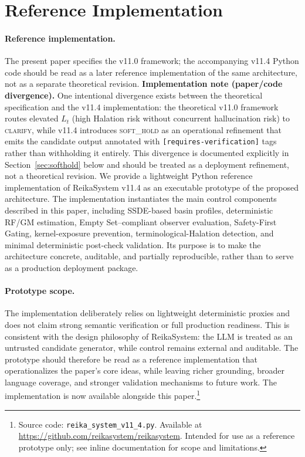 \documentclass[11pt,a4paper]{article}
\begin{document}
\section{Reference Implementation}
\label{sec:impl}

\paragraph{Reference implementation.}
The present paper specifies the v11.0 framework; the accompanying v11.4 Python
code should be read as a later reference implementation of the same architecture,
not as a separate theoretical revision.
\textbf{Implementation note (paper/code divergence).}
One intentional divergence exists between the theoretical specification and the
v11.4 implementation: the theoretical v11.0 framework routes elevated $L_t$
(high Halation risk without concurrent hallucination risk) to \textsc{clarify},
while v11.4 introduces \textsc{soft\_hold} as an operational refinement that
emits the candidate output annotated with \texttt{[requires-verification]} tags
rather than withholding it entirely.
This divergence is documented explicitly in Section~\ref{sec:softhold} below and
should be treated as a deployment refinement, not a theoretical revision.
We provide a lightweight Python reference implementation of ReikaSystem v11.4
as an executable prototype of the proposed architecture.
The implementation instantiates the main control components described in this
paper, including SSDE-based basin profiles, deterministic RF/GM estimation,
Empty Set--compliant observer evaluation, Safety-First Gating,
kernel-exposure prevention, terminological-Halation detection,
and minimal deterministic post-check validation.
Its purpose is to make the architecture concrete, auditable, and partially
reproducible, rather than to serve as a production deployment package.

\paragraph{Prototype scope.}
The implementation deliberately relies on lightweight deterministic proxies
and does not claim strong semantic verification or full production readiness.
This is consistent with the design philosophy of ReikaSystem: the LLM is
treated as an untrusted candidate generator, while control remains external
and auditable.
The prototype should therefore be read as a reference implementation that
operationalizes the paper's core ideas, while leaving richer grounding,
broader language coverage, and stronger validation mechanisms to future work.
The implementation is now available alongside this paper.\footnote{
  Source code: \texttt{reika\_system\_v11\_4.py}.
  Available at \url{https://github.com/reikasystem/reikasystem}.
  Intended for use as a reference prototype only;
  see inline documentation for scope and limitations.
}
\end{document}
